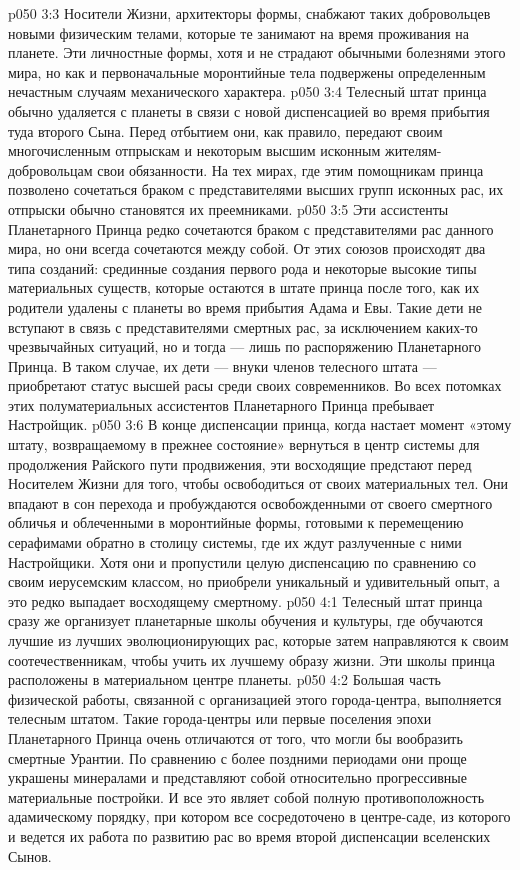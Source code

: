 \vs p050 3:3 Носители Жизни, архитекторы формы, снабжают таких добровольцев новыми физическим телами, которые те занимают на время проживания на планете. Эти личностные формы, хотя и не страдают обычными болезнями этого мира, но как и первоначальные моронтийные тела подвержены определенным нечастным случаям механического характера.
\vs p050 3:4 \pc Телесный штат принца обычно удаляется с планеты в связи с новой диспенсацией во время прибытия туда второго Сына. Перед отбытием они, как правило, передают своим многочисленным отпрыскам и некоторым высшим исконным жителям\hyp{}добровольцам свои обязанности. На тех мирах, где этим помощникам принца позволено сочетаться браком с представителями высших групп исконных рас, их отпрыски обычно становятся их преемниками.
\vs p050 3:5 Эти ассистенты Планетарного Принца редко сочетаются браком с представителями рас данного мира, но они всегда сочетаются между собой. От этих союзов происходят два типа созданий: срединные создания первого рода и некоторые высокие типы материальных существ, которые остаются в штате принца после того, как их родители удалены с планеты во время прибытия Адама и Евы. Такие дети не вступают в связь с представителями смертных рас, за исключением каких\hyp{}то чрезвычайных ситуаций, но и тогда --- лишь по распоряжению Планетарного Принца. В таком случае, их дети --- внуки членов телесного штата --- приобретают статус высшей расы среди своих современников. Во всех потомках этих полуматериальных ассистентов Планетарного Принца пребывает Настройщик.
\vs p050 3:6 В конце диспенсации принца, когда настает момент «этому штату, возвращаемому в прежнее состояние» вернуться в центр системы для продолжения Райского пути продвижения, эти восходящие предстают перед Носителем Жизни для того, чтобы освободиться от своих материальных тел. Они впадают в сон перехода и пробуждаются освобожденными от своего смертного обличья и облеченными в моронтийные формы, готовыми к перемещению серафимами обратно в столицу системы, где их ждут разлученные с ними Настройщики. Хотя они и пропустили целую диспенсацию по сравнению со своим иерусемским классом, но приобрели уникальный и удивительный опыт, а это редко выпадает восходящему смертному.
\vs p050 4:1 Телесный штат принца сразу же организует планетарные школы обучения и культуры, где обучаются лучшие из лучших эволюционирующих рас, которые затем направляются к своим соотечественникам, чтобы учить их лучшему образу жизни. Эти школы принца расположены в материальном центре планеты.
\vs p050 4:2 Большая часть физической работы, связанной с организацией этого города\hyp{}центра, выполняется телесным штатом. Такие города\hyp{}центры или первые поселения эпохи Планетарного Принца очень отличаются от того, что могли бы вообразить смертные Урантии. По сравнению с более поздними периодами они проще украшены минералами и представляют собой относительно прогрессивные материальные постройки. И все это являет собой полную противоположность адамическому порядку, при котором все сосредоточено в центре\hyp{}саде, из которого и ведется их работа по развитию рас во время второй диспенсации вселенских Сынов.
